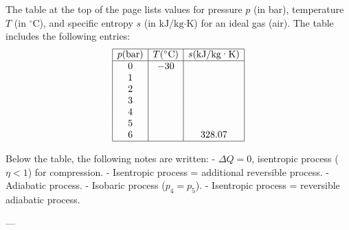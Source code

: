 The table at the top of the page lists values for pressure \( p \) (in bar), temperature \( T \) (in \( ^\circ \text{C} \)), and specific entropy \( s \) (in \( \text{kJ/kg·K} \)) for an ideal gas (air). The table includes the following entries:  
\[
\begin{array}{|c|c|c|}
\hline
p (\text{bar}) & T (^\circ \text{C}) & s (\text{kJ/kg·K}) \\
\hline
0 & -30 & \\
1 & & \\
2 & & \\
3 & & \\
4 & & \\
5 & & \\
6 & & 328.07 \\
\hline
\end{array}
\]

Below the table, the following notes are written:  
- \( \Delta Q = 0 \), isentropic process (\( \eta < 1 \)) for compression.  
- Isentropic process = additional reversible process.  
- Adiabatic process.  
- Isobaric process (\( p_4 = p_5 \)).  
- Isentropic process = reversible adiabatic process.  

---